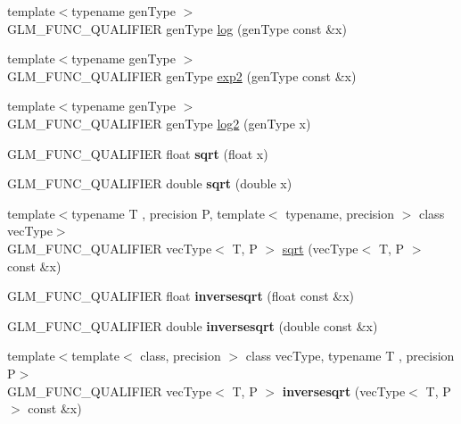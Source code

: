 \begin{DoxyCompactItemize}
\item 
{\footnotesize template$<$typename gen\-Type $>$ }\\G\-L\-M\-\_\-\-F\-U\-N\-C\-\_\-\-Q\-U\-A\-L\-I\-F\-I\-E\-R gen\-Type \hyperlink{group__core__func__exponential_ga0c8da2d2921da250e8700ac4476916a1}{log} (gen\-Type const \&x)
\item 
{\footnotesize template$<$typename gen\-Type $>$ }\\G\-L\-M\-\_\-\-F\-U\-N\-C\-\_\-\-Q\-U\-A\-L\-I\-F\-I\-E\-R gen\-Type \hyperlink{group__core__func__exponential_gac45997fb3ac907cad408d6da0a0f5f54}{exp2} (gen\-Type const \&x)
\item 
{\footnotesize template$<$typename gen\-Type $>$ }\\G\-L\-M\-\_\-\-F\-U\-N\-C\-\_\-\-Q\-U\-A\-L\-I\-F\-I\-E\-R gen\-Type \hyperlink{group__core__func__exponential_gad41e336e9bc8190fe99d2cfd9261c19b}{log2} (gen\-Type x)
\item 
\hypertarget{namespaceglm_aef7d852d92e7b9e556300aaf14863741}{G\-L\-M\-\_\-\-F\-U\-N\-C\-\_\-\-Q\-U\-A\-L\-I\-F\-I\-E\-R float {\bfseries sqrt} (float x)}\label{namespaceglm_aef7d852d92e7b9e556300aaf14863741}

\item 
\hypertarget{namespaceglm_a71f6d03bb8b54de18812b782194f6ac5}{G\-L\-M\-\_\-\-F\-U\-N\-C\-\_\-\-Q\-U\-A\-L\-I\-F\-I\-E\-R double {\bfseries sqrt} (double x)}\label{namespaceglm_a71f6d03bb8b54de18812b782194f6ac5}

\item 
{\footnotesize template$<$typename T , precision P, template$<$ typename, precision $>$ class vec\-Type$>$ }\\G\-L\-M\-\_\-\-F\-U\-N\-C\-\_\-\-Q\-U\-A\-L\-I\-F\-I\-E\-R vec\-Type$<$ T, P $>$ \hyperlink{group__core__func__exponential_ga2ea6c6738ad6e09ec3405a628047801b}{sqrt} (vec\-Type$<$ T, P $>$ const \&x)
\item 
\hypertarget{namespaceglm_af2e9f33f212954ecca568cf1485ccbe8}{G\-L\-M\-\_\-\-F\-U\-N\-C\-\_\-\-Q\-U\-A\-L\-I\-F\-I\-E\-R float {\bfseries inversesqrt} (float const \&x)}\label{namespaceglm_af2e9f33f212954ecca568cf1485ccbe8}

\item 
\hypertarget{namespaceglm_a83786622d7ff4afca48a9c730b4cabf4}{G\-L\-M\-\_\-\-F\-U\-N\-C\-\_\-\-Q\-U\-A\-L\-I\-F\-I\-E\-R double {\bfseries inversesqrt} (double const \&x)}\label{namespaceglm_a83786622d7ff4afca48a9c730b4cabf4}

\item 
\hypertarget{namespaceglm_a3f7480375deccaf2afd47faa620d5fd8}{{\footnotesize template$<$template$<$ class, precision $>$ class vec\-Type, typename T , precision P$>$ }\\G\-L\-M\-\_\-\-F\-U\-N\-C\-\_\-\-Q\-U\-A\-L\-I\-F\-I\-E\-R vec\-Type$<$ T, P $>$ {\bfseries inversesqrt} (vec\-Type$<$ T, P $>$ const \&x)}\label{namespaceglm_a3f7480375deccaf2afd47faa620d5fd8}


\end{DoxyCompactItemize}
